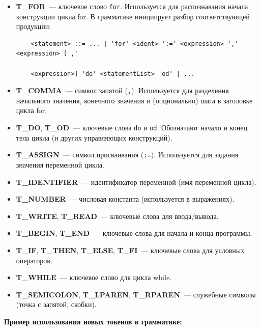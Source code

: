 \documentclass[areasetadvanced]{scrartcl}
\begin{document}
\begin{itemize}
    \item \textbf{T\_FOR}~--- ключевое слово \texttt{for}. Используется для распознавания начала конструкции цикла for. В грамматике инициирует разбор соответствующей продукции:
    \begin{verbatim}
    <statement> ::= ... | 'for' <ident> ':=' <expression> ',' <expression> [',' 
    
    <expression>] 'do' <statementList> 'od' | ...
    \end{verbatim}

    \item \textbf{T\_COMMA}~--- символ запятой (\texttt{,}). Используется для разделения начального значения, конечного значения и (опционально) шага в заголовке цикла for.

    \item \textbf{T\_DO}, \textbf{T\_OD}~--- ключевые слова \texttt{do} и \texttt{od}. Обозначают начало и конец тела цикла (и других управляющих конструкций).

    \item \textbf{T\_ASSIGN}~--- символ присваивания (\texttt{:=}). Используется для задания значения переменной цикла.

    \item \textbf{T\_IDENTIFIER}~--- идентификатор переменной (имя переменной цикла).

    \item \textbf{T\_NUMBER}~--- числовая константа (используется в выражениях).

    \item \textbf{T\_WRITE}, \textbf{T\_READ}~--- ключевые слова для ввода/вывода.

    \item \textbf{T\_BEGIN}, \textbf{T\_END}~--- ключевые слова для начала и конца программы.

    \item \textbf{T\_IF}, \textbf{T\_THEN}, \textbf{T\_ELSE}, \textbf{T\_FI}~--- ключевые слова для условных операторов.

    \item \textbf{T\_WHILE}~--- ключевое слово для цикла while.

    \item \textbf{T\_SEMICOLON}, \textbf{T\_LPAREN}, \textbf{T\_RPAREN}~--- служебные символы (точка с запятой, скобки).
\end{itemize}

\textbf{Пример использования новых токенов в грамматике:}
\end{document}
